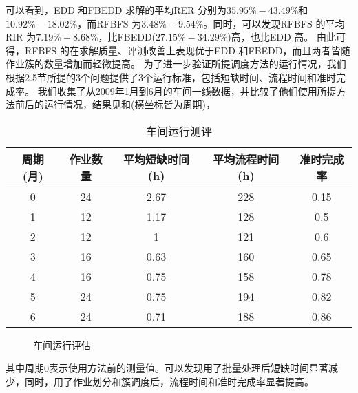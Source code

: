 可以看到，EDD 和FBEDD 求解的平均RER 分别为$35.95\% - 43.49\%$和$10.92\% - 18.02\%$，而RFBFS 为$3.48\% - 9.54\%$。同时，可以发现RFBFS 的平均RIR 为$7.19\% - 8.68\%$，比FBEDD($27.15\% - 34.29\%$)高，也比EDD 高。
由此可得，RFBFS 的在求解质量、评测改善上表现优于EDD 和FBEDD，而且两者皆随作业簇的数量增加而轻微提高。
为了进一步验证所提调度方法的运行情况，我们根据2.5节所提的3个问题提供了3个运行标准，包括短缺时间、流程时间和准时完成率。
我们收集了从2009年1月到6月的车间一线数据，并比较了他们使用所提方法前后的运行情况，结果见和(横坐标皆为周期)，
\begin{table}[h]
  \centering\xiaowu
  \caption{车间运行测评}
    \begin{tabular}{ccccc}
    \toprule
    周期 (月) & 作业数量  & 平均短缺时间 (h) & 平均流程时间 (h) & 准时完成率 \\
    \midrule
    0     & 24    & 2.67  & 228   & 0.15 \\
    1     & 12    & 1.17  & 128   & 0.5 \\
    2     & 12    & 1     & 121   & 0.6 \\
    3     & 16    & 0.63  & 160   & 0.65 \\
    4     & 16    & 0.75  & 158   & 0.78 \\
    5     & 24    & 0.75  & 194   & 0.82 \\
    6     & 24    & 0.71  & 188   & 0.86 \\
    \bottomrule
    \end{tabular}
  \label{tab:performancemeasure}
\end{table}\vspace{-0.8cm}
\begin{figure}[h]
\begin{floatrow}
  \caption{车间运行评估\label{fig:performancemeasures}}
  \end{floatrow}
\end{figure}
其中周期0表示使用方法前的测量值。可以发现用了批量处理后短缺时间显著减少，同时，用了作业划分和簇调度后，流程时间和准时完成率显著提高。
